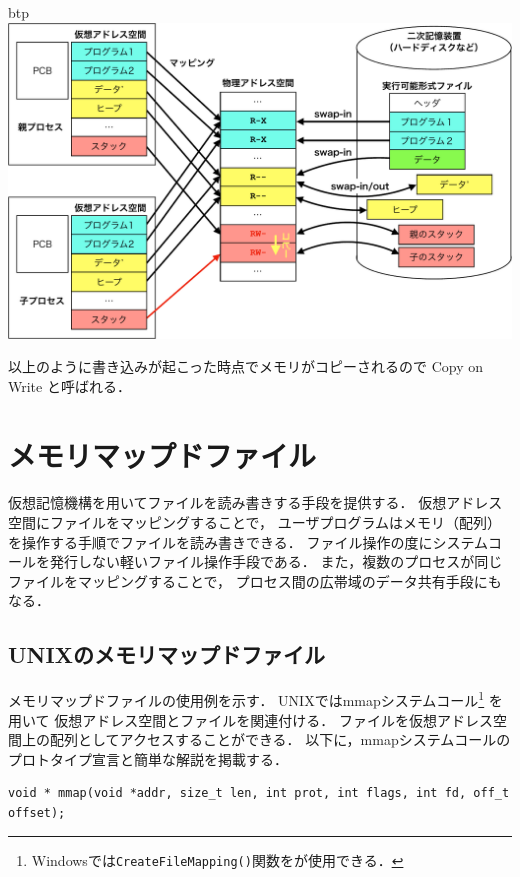 \begin{description}
\begin{myfig}{btp}
    \includegraphics[scale=0.66]{Fig/virtualMemoryCOW-crop.pdf}
  \end{myfig}
\end{description}

以上のように書き込みが起こった時点でメモリがコピーされるので
Copy on Write と呼ばれる．

\section{メモリマップドファイル}
仮想記憶機構を用いてファイルを読み書きする手段を提供する．
仮想アドレス空間にファイルをマッピングすることで，
ユーザプログラムはメモリ（配列）を操作する手順でファイルを読み書きできる．
ファイル操作の度にシステムコールを発行しない軽いファイル操作手段である．
また，複数のプロセスが同じファイルをマッピングすることで，
プロセス間の広帯域のデータ共有手段にもなる．

\subsection{UNIXのメモリマップドファイル}
メモリマップドファイルの使用例を示す．
UNIXではmmapシステムコール\footnote{
Windowsでは\texttt{CreateFileMapping()}関数をが使用できる．} を用いて
仮想アドレス空間とファイルを関連付ける．
ファイルを仮想アドレス空間上の配列としてアクセスすることができる．
以下に，mmapシステムコールのプロトタイプ宣言と簡単な解説を掲載する．

\begin{lstlisting}[numbers=none]
void * mmap(void *addr, size_t len, int prot, int flags, int fd, off_t offset);
\end{lstlisting}

